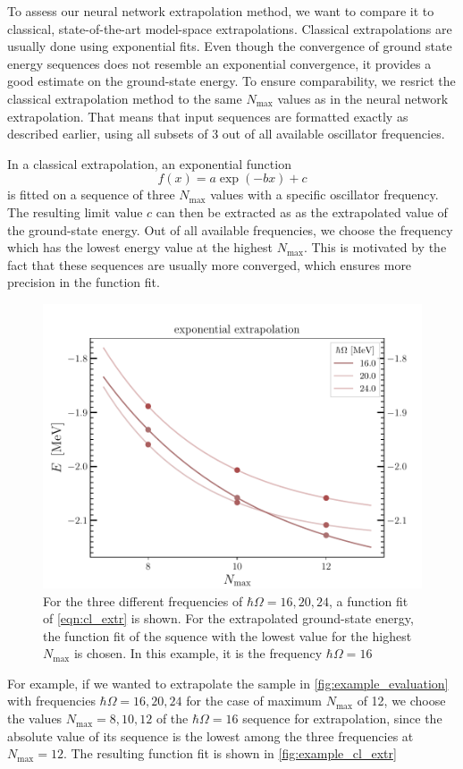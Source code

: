 To assess our neural network extrapolation method, we want to compare it to classical, state-of-the-art model-space extrapolations. Classical extrapolations are usually done using exponential fits. Even though the convergence of ground state energy sequences does not resemble an exponential convergence, it provides a good estimate on the ground-state energy. To ensure comparability, we resrict the classical extrapolation method to the same $N_\mathrm{max}$ values as in the neural network extrapolation. That means that input sequences are formatted exactly as described earlier, using all subsets of 3 out of all available oscillator frequencies.


In a classical extrapolation, an exponential function
\begin{equation}
  \label{eqn:cl_extr}
  f(x) = a \exp(-bx) + c
\end{equation}
is fitted on a sequence of three $N_\mathrm{max}$ values with a specific oscillator frequency. The resulting limit value $c$ can then be extracted as as the extrapolated value of the ground-state energy. Out of all available frequencies, we choose the frequency which has the lowest energy value at the highest $N_\mathrm{max}$. This is motivated by the fact that these sequences are usually more converged, which ensures more precision in the function fit.

\begin{figure}[H]
  \centering
  \includegraphics[width=.5\textwidth]{media/example_cl_extr.pdf}
  \caption{For the three different frequencies of $\hbar\Omega = 16, 20, 24$, a function fit of \autoref{eqn:cl_extr} is shown. For the extrapolated ground-state energy, the function fit of the squence with the lowest value for the highest $N_\mathrm{max}$ is chosen. In this example, it is the frequency $\hbar\Omega=16$}
  \label{fig:example_cl_extr}
\end{figure}
For example, if we wanted to extrapolate the sample in \autoref{fig:example_evaluation} with frequencies $\hbar\Omega = 16, 20, 24$ for the case of maximum $N_\mathrm{max}$ of 12, we choose the values  $N_\mathrm{max} = 8, 10, 12$ of the $\hbar\Omega = 16$ sequence for extrapolation, since the absolute value of its sequence is the lowest among the three frequencies at $N_\mathrm{max} = 12$. The resulting function fit is shown in \autoref{fig:example_cl_extr}
